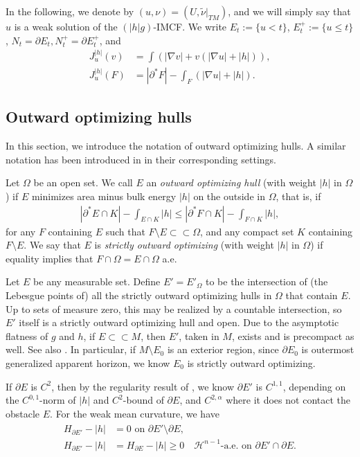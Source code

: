\documentclass[11pt, letterpaper]{amsart}
\theoremstyle{definition}
\theoremstyle{remark}
\begin{document}
In the following, we denote by $(u, \nu )= (U, \tilde{\nu }|_{TM})$, and we will simply say that $u$ is a weak solution of the $(|h|g)$-IMCF. We write $E_t:= \{ u< t\} $, $E_{t}^{+}:= \{ u \leq t\} $, $N_t = \partial E_t, N_t ^{+} = \partial E_t ^{+}$, and
\begin{align*}
	J_{u}^{|h|}(v) &= \int \left( |\nabla v| + v\left( |\nabla u| + |h| \right)  \right) ,\\
	J_{u}^{|h|}(F) &= |\partial ^* F| - \int_{F}\left( |\nabla u| + |h| \right) .
\end{align*} 


\subsection{Outward optimizing hulls}
In this section, we introduce the notation of outward optimizing hulls.
A similar notation has been introduced in \cite{HI01, Moore12, HuiskenWolff22} in their corresponding settings. 

Let $\Omega $ be an open set. We call $E$ an \textit{outward optimizing hull} (with weight $|h|$ in $\Omega $) if $E$ minimizes area minus bulk energy $|h|$ on the outside in $\Omega $, that is, if
\begin{align}\label{defn-optimizing-hull}
	|\partial ^* E \cap K| - \int_{E \cap K} |h| \leq |\partial ^* F \cap K| - \int_{F \cap K} |h|,
\end{align}
for any $F$ containing $E$ such that $F \setminus E \subset \subset \Omega $, and any compact set $K$ containing $F \setminus E$. We say that $E$ is \textit{strictly outward optimizing} (with weight $|h|$ in $\Omega $) if equality implies that $F \cap \Omega = E \cap \Omega $ a.e. 

Let $E$ be any measurable set. Define $E' = E'_{\Omega }$ to be the intersection of (the Lebesgue points of) all the strictly outward optimizing hulls in $\Omega $ that contain $E$. Up to sets of measure zero, this may be realized by a countable intersection, so $E'$ itself is a strictly outward optimizing hull and open. Due to the asymptotic flatness of $g$ and $h$, if $E \subset \subset M$, then $E'$, taken in $M$, exists and is precompact as well. See also \cite{Eichmair10}. In particular, if $M \setminus E_0$ is an exterior region, since $\partial E_0$ is outermost generalized apparent horizon, we know $E_0$ is strictly outward optimizing.

If $\partial E$ is $C^2$, then by the regularity result of \cite{BK74}, we know $\partial E'$ is $C^{1,1}$, depending on the $C^{0,1}$-norm of $|h|$ and $C^2$-bound of $\partial E$, and $C^{2,\alpha }$ where it does not contact the obstacle $E$. For the weak mean curvature, we have
\begin{align}\label{mean-curv-hull}
	\begin{split}
		H_{\partial E'} -|h| &= 0 \text{ on } \partial E' \setminus \partial E,\\
		H_{\partial E'} - |h| &= H_{\partial E} - |h| \geq 0 \quad \mathcal{H}^{n-1}\text{-a.e. on } \partial E' \cap \partial E.
	\end{split}
\end{align}
\end{document}
